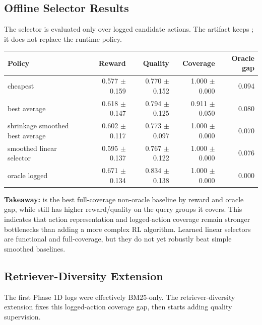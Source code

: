 \subsection{Offline Selector Results}

The selector is evaluated only over logged candidate actions. The artifact keeps ; it does not replace the runtime  policy.

\begin{center}
\small
\begin{tabular}{>{\raggedright\arraybackslash}p{4.4cm} r r r r}
\toprule
Policy & Reward & Quality & Coverage & Oracle gap \\
\midrule
cheapest & 0.577 $\pm$ 0.159 & 0.770 $\pm$ 0.152 & 1.000 $\pm$ 0.000 & 0.094 \\
best average & 0.618 $\pm$ 0.147 & 0.794 $\pm$ 0.125 & 0.911 $\pm$ 0.050 & 0.080 \\
shrinkage smoothed best average & 0.602 $\pm$ 0.117 & 0.773 $\pm$ 0.097 & 1.000 $\pm$ 0.000 & 0.070 \\
smoothed linear selector & 0.595 $\pm$ 0.137 & 0.767 $\pm$ 0.122 & 1.000 $\pm$ 0.000 & 0.076 \\
oracle logged & 0.671 $\pm$ 0.134 & 0.834 $\pm$ 0.138 & 1.000 $\pm$ 0.000 & 0.000 \\
\bottomrule
\end{tabular}
\end{center}

\textbf{Takeaway:}  is the best full-coverage non-oracle baseline by reward and oracle gap, while  still has higher reward/quality on the query groups it covers. This indicates that action representation and logged-action coverage remain stronger bottlenecks than adding a more complex RL algorithm. Learned linear selectors are functional and full-coverage, but they do not yet robustly beat simple smoothed baselines.

\subsection{Retriever-Diversity Extension}

The first Phase 1D logs were effectively BM25-only. The retriever-diversity extension fixes this logged-action coverage gap, then starts adding quality supervision.

